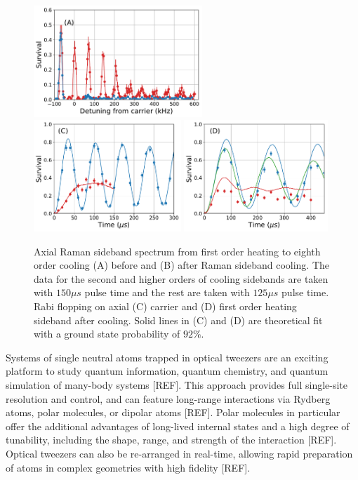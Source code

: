 \documentclass[aps,prl,twocolumn,groupedaddress]{revtex4-1}
\begin{document}
\begin{figure}
  \includegraphics[height=4.2cm]{imgs/spectrum_a1.pdf}
  \includegraphics[height=4.2cm]{imgs/rabi_flop_a1_0.pdf}
  \includegraphics[height=4.2cm]{imgs/rabi_flop_a1_p1.pdf}
  \caption{Axial Raman sideband spectrum from first order heating to eighth order cooling
    (A) before and (B) after Raman sideband cooling.
    The data for the second and higher orders of cooling sidebands are taken with $150\mu s$
    pulse time and the rest are taken with $125\mu s$ pulse time.
    Rabi flopping on axial (C) carrier and (D) first order heating sideband
    after cooling.
    Solid lines in (C) and (D) are theoretical fit with a ground state probability of $92\%$.
    \label{f-axial}}
\end{figure}

Systems of single neutral atoms trapped in optical tweezers are an exciting platform to study quantum information, quantum chemistry,
and quantum simulation of many-body systems [REF].
This approach provides full single-site resolution and control, and can feature long-range interactions via Rydberg atoms,
polar molecules, or dipolar atoms [REF].
Polar molecules in particular offer the additional advantages of long-lived internal states and a high degree of tunability,
including the shape, range, and strength of the interaction [REF].
Optical tweezers can also be re-arranged in real-time, allowing rapid preparation of atoms in complex geometries with high fidelity [REF].
\end{document}
